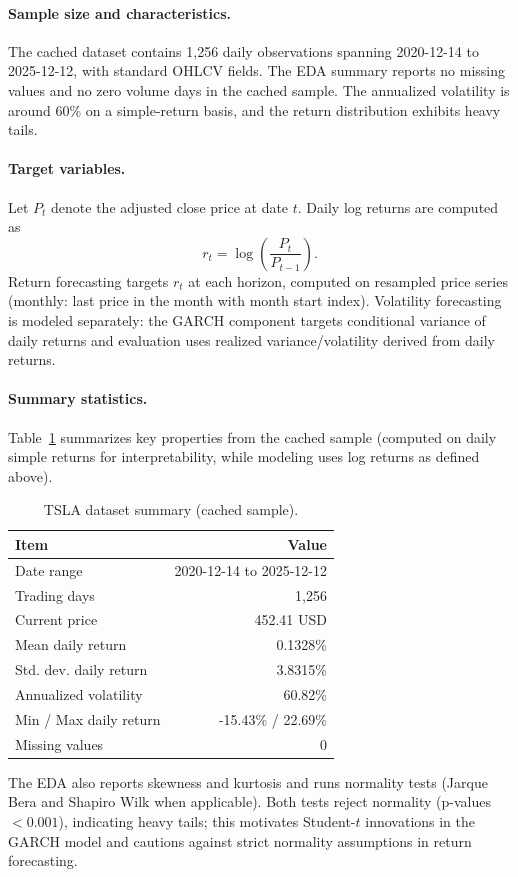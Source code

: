 \documentclass[11pt,a4paper]{article}
\begin{document}
\paragraph{Sample size and characteristics.}
The cached dataset contains 1,256 daily observations spanning 2020-12-14 to 2025-12-12, with standard OHLCV fields. The EDA summary reports no missing values and no zero volume days in the cached sample. The annualized volatility is around 60\% on a simple-return basis, and the return distribution exhibits heavy tails.

\paragraph{Target variables.}
Let $P_t$ denote the adjusted close price at date $t$. Daily log returns are computed as
\begin{equation}
\label{eq:logret}
 r_t = \log\left(\frac{P_t}{P_{t-1}}\right).
\end{equation}
Return forecasting targets $r_t$ at each horizon, computed on resampled price series (monthly: last price in the month with month start index). Volatility forecasting is modeled separately: the GARCH component targets conditional variance of daily returns and evaluation uses realized variance/volatility derived from daily returns.

\paragraph{Summary statistics.}
Table~\ref{tab:data-summary} summarizes key properties from the cached sample (computed on daily simple returns for interpretability, while modeling uses log returns as defined above).

\begin{table}[H]
\centering
\caption{TSLA dataset summary (cached sample).}
\label{tab:data-summary}
\begin{tabular}{l r}
\toprule
Item & Value \\
\midrule
Date range & 2020-12-14 to 2025-12-12 \\
Trading days & 1,256 \\
Current price & 452.41 USD \\
Mean daily return & 0.1328\% \\
Std. dev. daily return & 3.8315\% \\
Annualized volatility & 60.82\% \\
Min / Max daily return & -15.43\% / 22.69\% \\
Missing values & 0 \\
\bottomrule
\end{tabular}
\end{table}
\noindent The EDA also reports skewness and kurtosis and runs normality tests (Jarque Bera and Shapiro Wilk when applicable). Both tests reject normality (p-values $< 0.001$), indicating heavy tails; this motivates Student-$t$ innovations in the GARCH model and cautions against strict normality assumptions in return forecasting.
\end{document}
